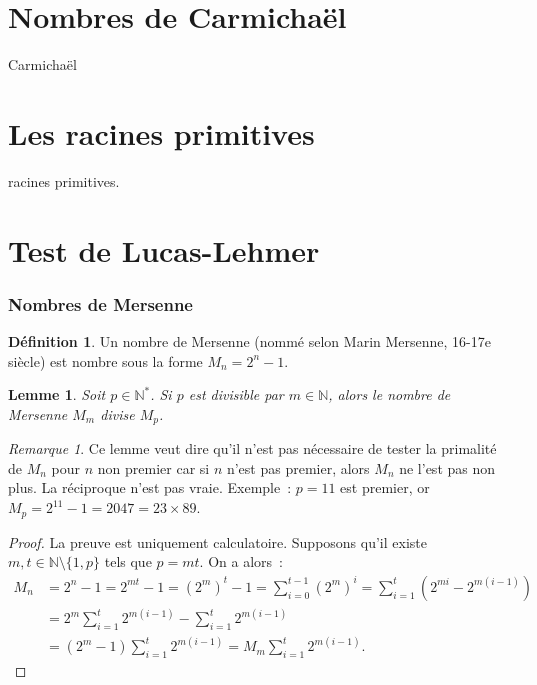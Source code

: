 \documentclass[10pt, mathserif]{beamer}
\newcommand{\N}{\mathbb N}
\newtheorem{lem}[thm]{Lemme}
\theoremstyle{definition}
\newtheorem{déf}[thm]{Définition}
\theoremstyle{remark}
\newtheorem*{rmq}{Remarque}
\begin{document}
\section{Nombres de Carmichaël}
	\begin{frame}
		Carmichaël
	\end{frame}

\section{Les racines primitives}
	\begin{frame}
		racines primitives.
	\end{frame}

\section{Test de Lucas-Lehmer}
	\begin{frame}
		\frametitle{Nombres de Mersenne}
		\begin{déf}
			Un nombre de Mersenne (nommé selon Marin Mersenne, 16-17e siècle) est nombre sous la forme $M_n = 2^n-1$.
		\end{déf}

		\begin{lem}
			Soit $p \in \N^*$. Si $p$ est divisible par $m \in \N$, alors le nombre de Mersenne $M_m$ divise $M_p$.
		\end{lem}

		\begin{rmq}
			Ce lemme veut dire qu'il n'est pas nécessaire de tester la primalité de $M_n$ pour $n$ non premier car si $n$ n'est pas premier, alors $M_n$ ne
			l'est pas non plus. La réciproque n'est pas vraie. Exemple~: $p = 11$ est premier, or $M_p = 2^{11}-1 = 2047 = 23 \times 89$.
		\end{rmq}
	\end{frame}

	\begin{frame}
		\begin{proof}
			La preuve est uniquement calculatoire. Supposons qu'il existe $m, t \in \N \setminus \{1, p\}$ tels que $p = mt$. On a alors~:
			\[\begin{aligned}
				M_n &= 2^n-1 = 2^{mt}-1 = \left(2^m\right)^t - 1 = \sum_{i=0}^{t-1}\left(2^m\right)^i = \sum_{i=1}^t\left(2^{mi} - 2^{m(i-1)}\right) \\
				    &= 2^m\sum_{i=1}^t2^{m(i-1)}-\sum_{i=1}^t2^{m(i-1)} \\
				    &= (2^m-1)\sum_{i=1}^t2^{m(i-1)} = M_m\sum_{i=1}^t2^{m(i-1)}.\end{aligned}\]
		\end{proof}
	\end{frame}
\end{document}

